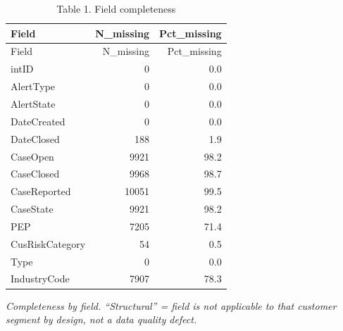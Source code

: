 \documentclass[
]{article}
\begin{document}
\begin{longtable}[]{@{}lrr@{}}
\caption{Table 1. Field completeness}\tabularnewline
\toprule\noalign{}
Field & N\_missing & Pct\_missing \\
\midrule\noalign{}
\endfirsthead
\toprule\noalign{}
Field & N\_missing & Pct\_missing \\
\midrule\noalign{}
\endhead
\bottomrule\noalign{}
\endlastfoot
intID & 0 & 0.0 \\
AlertType & 0 & 0.0 \\
AlertState & 0 & 0.0 \\
DateCreated & 0 & 0.0 \\
DateClosed & 188 & 1.9 \\
CaseOpen & 9921 & 98.2 \\
CaseClosed & 9968 & 98.7 \\
CaseReported & 10051 & 99.5 \\
CaseState & 9921 & 98.2 \\
PEP & 7205 & 71.4 \\
CusRiskCategory & 54 & 0.5 \\
Type & 0 & 0.0 \\
IndustryCode & 7907 & 78.3 \\
\end{longtable}

\emph{Completeness by field. ``Structural'' = field is not applicable to
that customer segment by design, not a data quality defect.}
\end{document}
